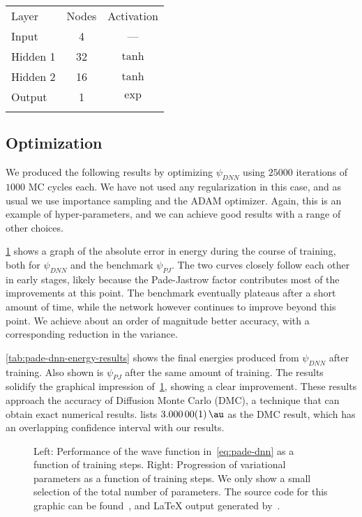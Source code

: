 \documentclass[Thesis.tex]{subfiles}
\begin{document}
\begin{center}
  \begin{tabular}{lcc}
    \toprule
    \addlinespace
    Layer & Nodes & Activation\\
    \addlinespace
    \midrule
    \addlinespace
    \addlinespace
    Input & 4 & ---\\
    Hidden 1& 32 & $\tanh$\\
    Hidden 2& 16 & $\tanh$\\
    Output & 1 & $\exp$\\
    \addlinespace
    \addlinespace
    \bottomrule
  \end{tabular}
\end{center}

\subsection{Optimization}

We produced the following results by optimizing $\psi_{DNN}$ using $\num{25000}$
iterations of $1000$ MC cycles each. We have not used any regularization in this
case, and as usual we use importance sampling and the ADAM optimizer.
Again, this is an example of hyper-parameters, and we can achieve good results
with a range of other choices.

\cref{fig:QD-pade-dnn-training} shows a graph of the absolute error in energy
during the course of training, both for $\psi_{DNN}$ and the benchmark
$\psi_{PJ}$. The two curves closely follow each other in early stages, likely
because the Pade-Jastrow factor contributes most of the improvements at this point. The
benchmark eventually plateaus after a short amount of time, while the
network however continues to improve beyond this point. We achieve about an
order of magnitude better accuracy, with a corresponding reduction in the
variance.

\cref{tab:pade-dnn-energy-results} shows the final energies produced from
$\psi_{DNN}$ after training. Also shown is $\psi_{PJ}$ after the same amount of
training. The results solidify the graphical impression
of~\cref{fig:QD-pade-dnn-training}, showing a clear improvement. These results
approach the accuracy of Diffusion Monte Carlo (DMC), a technique that can obtain
exact numerical results. \textcite{Pedersen-2011} lists $\SI{3.00000(1)}{\au}$
as the DMC result, which has an overlapping confidence interval with our results.

\begin{figure}[h]
   \centering
    \resizebox{\linewidth}{!}{%
        
    }
    \caption{\label{fig:QD-pade-dnn-training}Left: Performance of the wave
function in~\cref{eq:pade-dnn} as a function of training steps. Right:
Progression of variational parameters as a function of training steps. We only
show a small selection of the total number of parameters. The source code for this graphic
can be found~\cite[TODO: Add path]{MS-thesis-repository}, and \LaTeX{} output
generated by~\cite{nico_schlomer_2018_1173090}.}
\end{figure}
\end{document}
